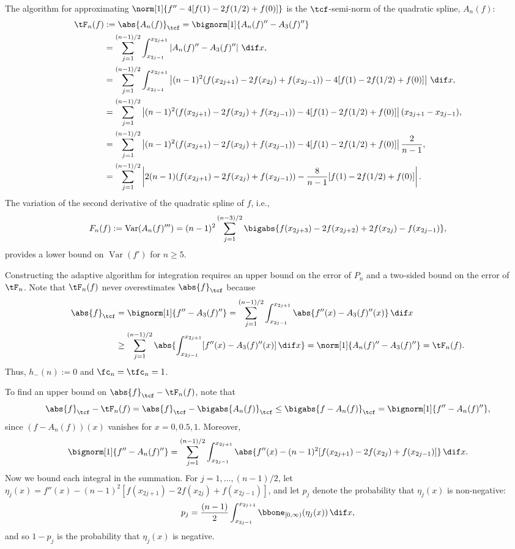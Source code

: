 \documentclass[]{elsarticle}
\DeclareMathOperator{\Var}{Var}
\theoremstyle{definition}
\theoremstyle{remark}
\newcommand{\Ftnorm}[1]{\abs{#1}_{\tcf}}
\begin{document}
The algorithm for approximating $\norm[1]{f''-4[f(1)-2f(1/2)+f(0)]}$ is the $\tcf$-semi-norm of the quadratic spline, $A_n(f)$:
\begin{align}
\nonumber
\tF_n(f)&:=\Ftnorm{A_n(f)}=\bignorm[1]{A_n(f)''-A_3(f)''} \\
\label{1direst} \nonumber
&=\sum_{j=1}^{(n-1)/2}\int_{x_{2j-1}}^{x_{2j+1}}\left|A_n(f)''-A_3(f)''\right|\,\dif x, \\ \nonumber
&=\sum_{j=1}^{(n-1)/2}\int_{x_{2j-1}}^{x_{2j+1}}\left|(n-1)^2(f(x_{2j+1})-2f(x_{2j})+f(x_{2j-1})) - 4[f(1)-2f(1/2)+f(0)]\right|\,\dif x, \\ \nonumber
&=\sum_{j=1}^{(n-1)/2}\left|(n-1)^2(f(x_{2j+1})-2f(x_{2j})+f(x_{2j-1})) - 4[f(1)-2f(1/2)+f(0)]\right|(x_{2j+1}-x_{2j-1}), \\ \nonumber
&=\sum_{j=1}^{(n-1)/2}\left|(n-1)^2(f(x_{2j+1})-2f(x_{2j})+f(x_{2j-1})) - 4[f(1)-2f(1/2)+f(0)]\right|\frac{2}{n-1}, \\
&=\sum_{j=1}^{(n-1)/2}\left|2(n-1)(f(x_{2j+1})-2f(x_{2j})+f(x_{2j-1})) - \frac{8}{n-1}[f(1)-2f(1/2)+f(0)]\right|.
\end{align}
The variation of the second derivative of the quadratic spline of $f$, i.e.,
\begin{equation} \label{Fnormalg}
F_n(f) :=\Var(A_n(f)''') = (n-1)^2\sum_{j=1}^{(n-3)/2} \bigabs{f(x_{2j+3}) - 2 f(x_{2j+2})+2f(x_{2j})-f(x_{2j-1})},
\end{equation}
provides a lower bound on $\Var(f')$ for $n \ge 5$.

Constructing the adaptive algorithm for integration requires an upper bound on the error of $P_n$ and a two-sided bound on the error of $\tF_n$.  Note that $\tF_{n}(f)$ never overestimates $\Ftnorm{f}$ because
\begin{align*}
\Ftnorm{f} & = \bignorm[1]{f''-A_3(f)''}
= \sum_{j=1}^{(n-1)/2} \int_{x_{2j-1}}^{x_{2j+1}} \abs{f''(x) - A_3(f)''(x)} \, \dif x \\
& \ge \sum_{j=1}^{(n-1)/2} \abs{\int_{x_{2j-1}}^{x_{2j+1}} [f''(x) - A_3(f)''(x)] \, \dif x}=\norm[1]{A_n(f)''-A_3(f)''} = \tF_n(f).
\end{align*}
Thus, $h_{-}(n):=0$ and $\fc_n=\tfc_n=1$.

To find an upper bound on $\Ftnorm{f}-\tF_{n}(f)$, note that
\begin{equation*}
\Ftnorm{f} - \tF_{n}(f) = \Ftnorm{f} - \bigabs{A_n(f)}_{\tcf} \le \bigabs{f-A_n(f)}_{\tcf} = \bignorm[1]{f'' -A_n(f)''},
\end{equation*}
since $(f-A_n(f))(x)$ vanishes for $x=0,0.5,1$.  Moreover,
\begin{equation} \label{onenormfp}
\bignorm[1]{f'' -A_n(f)''} = \sum_{j=1}^{(n-1)/2} \int_{x_{2j-1}}^{x_{2j+1}} \abs{f''(x) -(n-1)^2[f(x_{2j+1})-2f(x_{2j})+f(x_{2j-1})]} \, \dif x.
\end{equation}
Now we bound each integral in the summation.  For $j=1, \ldots, (n-1)/2$, let $\eta_j(x) = f''(x) -(n-1)^2[f(x_{2j+1})-2f(x_{2j})+f(x_{2j-1})]$, and let $p_j$ denote the probability that $\eta_j(x)$ is non-negative:
\[
p_j = \frac{(n-1)}{2}\int_{x_{2j-1}}^{x_{2j+1}} \bbone_{[0,\infty)} (\eta_j(x)) \, \dif x,
\]
and so $1-p_j$ is the probability that $\eta_j(x)$ is negative.  
\end{document}
